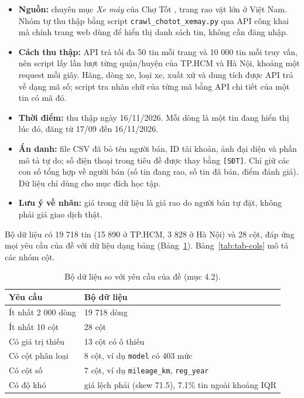 \begin{itemize}
  \item \textbf{Nguồn:} chuyên mục \textit{Xe máy} của Chợ Tốt \cite{tab-chotot}, trang rao vặt lớn ở Việt Nam. Nhóm tự
        thu thập bằng script \texttt{crawl\_chotot\_xemay.py} qua API công khai mà chính trang web dùng để hiển thị danh
        sách tin, không cần đăng nhập.
  \item \textbf{Cách thu thập:} API trả tối đa 50 tin mỗi trang và 10 000 tin mỗi truy vấn, nên script lấy lần lượt
        từng quận/huyện của TP.HCM và Hà Nội, khoảng một request mỗi giây. Hãng, dòng xe, loại xe, xuất xứ và dung tích
        được API trả về dạng mã số; script tra nhãn chữ của từng mã bằng API chi tiết của một tin có mã đó.
  \item \textbf{Thời điểm:} thu thập ngày 16/11/2026. Mỗi dòng là một tin đang hiển thị lúc đó, đăng từ 17/09 đến
        16/11/2026.
  \item \textbf{Ẩn danh:} file CSV đã bỏ tên người bán, ID tài khoản, ảnh đại diện và phần mô tả tự do; số điện thoại
        trong tiêu đề được thay bằng \texttt{[SĐT]}. Chỉ giữ các con số tổng hợp về người bán (số tin đang rao, số tin
        đã bán, điểm đánh giá). Dữ liệu chỉ dùng cho mục đích học tập.
  \item \textbf{Lưu ý về nhãn:} giá trong dữ liệu là giá rao do người bán tự đặt, không phải giá giao dịch thật.
\end{itemize}

Bộ dữ liệu có 19 718 tin (15 890 ở TP.HCM, 3 828 ở Hà Nội) và 28 cột, đáp ứng mọi yêu cầu của đề với dữ liệu dạng bảng
(Bảng~\ref{tab:tab-req}). Bảng~\ref{tab:tab-cols} mô tả các nhóm cột.

\begin{table}[H]\centering
\caption{Bộ dữ liệu so với yêu cầu của đề (mục 4.2).}\label{tab:tab-req}
\begin{tabular}{ll}
\toprule
Yêu cầu & Bộ dữ liệu \\
\midrule
Ít nhất 2 000 dòng & 19 718 dòng \\
Ít nhất 10 cột & 28 cột \\
Có giá trị thiếu & 13 cột có ô thiếu \\
Có cột phân loại & 8 cột, ví dụ \texttt{model} có 403 mức \\
Có cột số & 7 cột, ví dụ \texttt{mileage\_km}, \texttt{reg\_year} \\
Có độ khó & giá lệch phải (skew 71.5), 7.1\% tin ngoài khoảng IQR \\
\bottomrule
\end{tabular}
\end{table}

